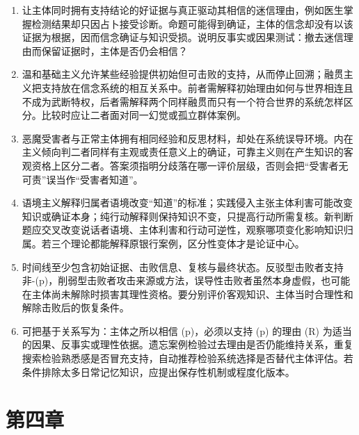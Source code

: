 \begin{enumerate}
\item 让主体同时拥有支持结论的好证据与真正驱动其相信的迷信理由，例如医生掌握检测结果却只因占卜接受诊断。命题可能得到确证，主体的信念却没有以该证据为根据，因而信念确证与知识受损。说明反事实或因果测试：撤去迷信理由而保留证据时，主体是否仍会相信？
\item 温和基础主义允许某些经验提供初始但可击败的支持，从而停止回溯；融贯主义把支持放在信念系统的相互关系中。前者需解释初始理由如何与世界相连且不成为武断特权，后者需解释两个同样融贯而只有一个符合世界的系统怎样区分。比较时应让二者面对同一幻觉或孤立群体案例。
\item 恶魔受害者与正常主体拥有相同经验和反思材料，却处在系统误导环境。内在主义倾向判二者同样有主观或责任意义上的确证，可靠主义则在产生知识的客观资格上区分二者。答案须指明分歧落在哪一评价层级，否则会把“受害者无可责”误当作“受害者知道”。
\item 语境主义解释归属者语境改变“知道”的标准；实践侵入主张主体利害可能改变知识或确证本身；纯行动解释则保持知识不变，只提高行动所需复核。新判断题应交叉改变说话者语境、主体利害和行动可逆性，观察哪项变化影响知识归属。若三个理论都能解释原银行案例，区分性变体才是论证中心。
\item 时间线至少包含初始证据、击败信息、复核与最终状态。反驳型击败者支持非-(p)，削弱型击败者攻击来源或方法，误导性击败者虽然本身虚假，也可能在主体尚未解除时损害其理性资格。要分别评价客观知识、主体当时合理性和解除击败后的恢复条件。
\item 可把基于关系写为：主体之所以相信 (p)，必须以支持 (p) 的理由 (R) 为适当的因果、反事实或理性依据。遗忘案例检验过去理由是否仍能维持关系，重复搜索检验熟悉感是否冒充支持，自动推荐检验系统选择是否替代主体评估。若条件排除太多日常记忆知识，应提出保存性机制或程度化版本。
\end{enumerate}

\section*{第四章}

